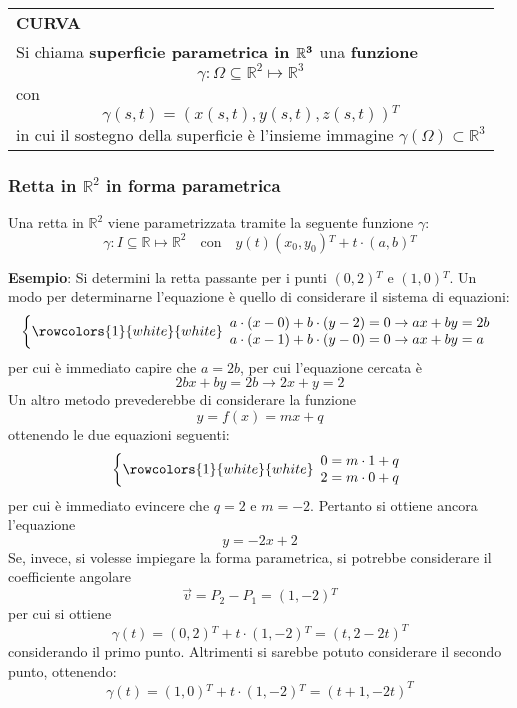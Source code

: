 \documentclass[a4paper]{extarticle}
\renewcommand\arraystretch{}
\begin{document}
\vspace{1em}
\setlength{\tabcolsep}{14pt}
\renewcommand{\arraystretch}{2}
\noindent
\begin{tabularx}{\textwidth}{@{}|P|@{}}
    \hline
    {\textbf{CURVA}}\\
    \parbox{\linewidth}{Si chiama \textbf{superficie parametrica in $\bf{\mathbb{R}^3}$} una \textbf{funzione}
    \[\gamma : \Omega \subseteq \mathbb{R}^2 \longmapsto \mathbb{R}^3\]
    con
    \[\gamma(s,t) = \left(x(s,t),y(s,t),z(s,t)\right){^T}\]
    in cui il sostegno della superficie è l'insieme immagine $\gamma(\Omega) \subset \mathbb{R}^3$ \vspace{3mm}}\\
    \hline
\end{tabularx}

\vspace{2em}
\noindent
\subsubsection{Retta in $\mathbb{R}^2$ in forma parametrica}
Una retta in $\mathbb{R}^2$ viene parametrizzata tramite la seguente funzione $\gamma$:
\[\gamma : I \subseteq \mathbb{R} \longmapsto \mathbb{R}^2 \hspace{1em} \text{con} \hspace{1em} y(t) (x_0,y_0){^T} + t \cdot (a,b){^T}\]

\vspace{1em}
\noindent
\textbf{Esempio}: Si determini la retta passante per i punti $(0,2){^T}$ e $(1,0){^T}$. Un modo per determinarne l'equazione è quello di considerare il sistema di equazioni:
\[\left\{
    \rowcolors{1}{white}{white}
    \begin{array}{l}
        a \cdot (x-0) + b \cdot (y-2) = 0 \rightarrow ax + by = 2b\\
        a \cdot (x-1) + b \cdot (y-0) = 0 \rightarrow ax + by = a\\
    \end{array}
\right.\]
per cui è immediato capire che $a=2b$, per cui l'equazione cercata è
\[2bx + by = 2b \rightarrow 2x + y = 2\]
Un altro metodo prevederebbe di considerare la funzione
\[y=f(x)=mx+q\]
ottenendo le due equazioni seguenti:
\[\left\{
    \rowcolors{1}{white}{white}
    \begin{array}{l}
        0=m \cdot 1 + q\\
        2=m \cdot 0 + q
    \end{array}
\right.\]
per cui è immediato evincere che $q=2$ e $m=-2$. Pertanto si ottiene ancora l'equazione
\[y=-2x+2\]
Se, invece, si volesse impiegare la forma parametrica, si potrebbe considerare il coefficiente angolare
\[\vec v = P_2-P_1=(1,-2){^T}\]
per cui si ottiene 
\[\gamma(t) = (0,2){^T} + t \cdot (1,-2){^T} = (t,2-2t)^{T}\]
considerando il primo punto. Altrimenti si sarebbe potuto considerare il secondo punto, ottenendo:
\[\gamma(t) = (1,0){^T} + t \cdot (1,-2){^T} = (t+1,-2t)^{T}\]
\end{document}
